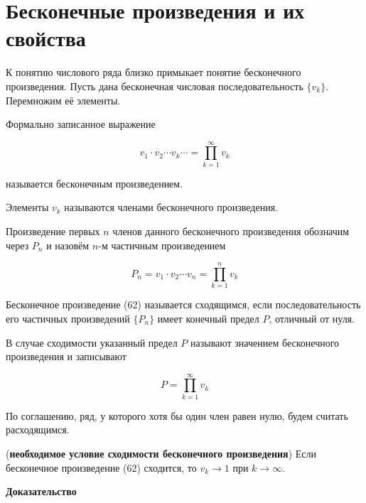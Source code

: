 \section{Бесконечные произведения и их свойства}

К понятию числового ряда близко примыкает понятие бесконечного произведения. Пусть дана бесконечная числовая последовательность $\{v_k\}$. Перемножим её элементы. 

\begin{definition}
	Формально записанное выражение
	
	\begin{equation}
		v_1 \cdot v_2 \cdots v_k \cdots = \displaystyle\prod_{k = 1}^\infty v_k
	\end{equation}
	
	называется бесконечным произведением.
\end{definition}

\begin{definition}
	Элементы $v_k$ называются членами бесконечного произведения.
\end{definition}
 
 Произведение первых $n$ членов данного бесконечного произведения обозначим через $P_n$ и назовём $n$-м частичным произведением
 
 \begin{equation*}
 	P_n = v_1 \cdot v_2 \cdots v_n = \displaystyle\prod_{k = 1}^n v_k
 \end{equation*}
 
 \begin{definition}
 	Бесконечное произведение (62) называется сходящимся, если последовательность его частичных произведений $\{P_n\}$ имеет конечный предел $P$, отличный от нуля.
 \end{definition}
 
 В случае сходимости указанный предел $P$ называют значением бесконечного произведения и записывают
 
 \begin{equation*}
 	P = \displaystyle\prod_{k = 1}^\infty v_k
 \end{equation*}
 
 По соглашению, ряд, у которого хотя бы один член равен нулю, будем считать расходящимся.
 
 \begin{theorem}
 	(\textbf{необходимое условие сходимости бесконечного произведения}) Если бесконечное произведение (62) сходится, то $v_k \rightarrow 1$ при $k \rightarrow \infty$.
 \end{theorem}
 \textbf{Доказательство}
 
